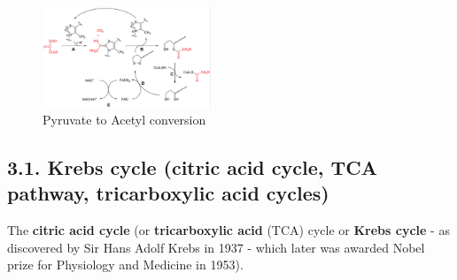 \begin{figure}[htb]
  \centerline{\includegraphics[height=3cm]{./images/pyruvate-to-acetyl-CoA-detail.eps}}
  \caption{Pyruvate to Acetyl conversion}
  \label{fig:pyruvate-to-acetyl-CoA-detail}
\end{figure}


%
%
%


\subsection{3.1. Krebs cycle (citric acid cycle, TCA pathway, tricarboxylic
acid cycles)}
\label{sec:krebs-cycle}
\label{sec:citric-acid-cycle}
\label{sec:TCA-pathway}

The {\bf citric acid cycle} (or {\bf tricarboxylic acid} (TCA) cycle or
{\bf Krebs cycle} - as discovered by Sir Hans Adolf Krebs in 1937 - which later
was awarded Nobel prize for Physiology and Medicine in 1953).


